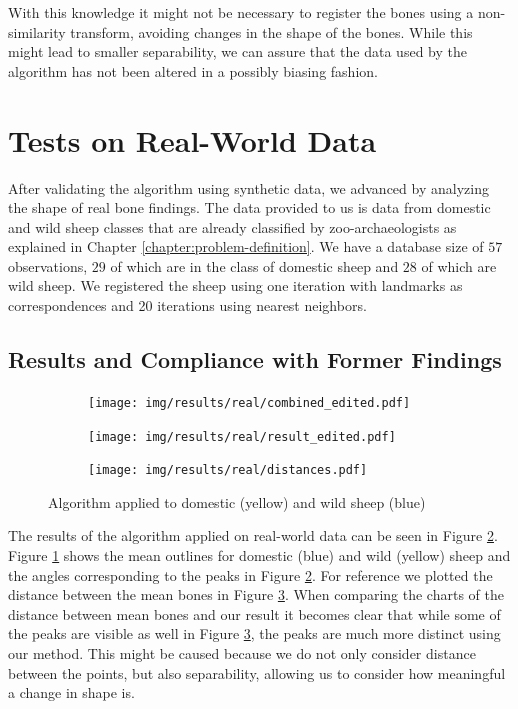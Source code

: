 \documentclass[pdftex,12pt,a4paper]{report}
\begin{document}
With this knowledge it might not be necessary to register the bones using a non-similarity transform, avoiding changes in the shape of the bones. While this might lead to smaller separability, we can assure that the data used by the algorithm has not been altered in a possibly biasing fashion.

\section{Tests on Real-World Data}

After validating the algorithm using synthetic data, we advanced by analyzing the shape of real bone findings. The data provided to us is data from domestic and wild sheep classes that are already classified by zoo-archaeologists as explained in Chapter \ref{chapter:problem-definition}. We have a database size of $57$ observations, $29$ of which are in the class of domestic sheep and $28$ of which are wild sheep. We registered the sheep using one iteration with landmarks as correspondences and 20 iterations using nearest neighbors.

\subsection{Results and Compliance with Former Findings} 

\begin{figure}
	\centering
	\begin{subfigure}[b]{0.32\textwidth}
		\centering
		\texttt{[image: img/results/real/combined\_edited.pdf]}
		\label{fig:main-result-data}
	\end{subfigure}
	\begin{subfigure}[b]{0.32\textwidth}
		\centering
		\texttt{[image: img/results/real/result\_edited.pdf]}
		\label{fig:main-result-chart}
	\end{subfigure}
	\begin{subfigure}[b]{0.32\textwidth}
		\centering
		\texttt{[image: img/results/real/distances.pdf]}
		\label{fig:main-result-distance}
	\end{subfigure}
	\caption{Algorithm applied to domestic (yellow) and wild sheep (blue)}
	\label{fig:main-result}
\end{figure}

The results of the algorithm applied on real-world data can be seen in Figure \ref{fig:main-result-chart}. Figure \ref{fig:main-result-data} shows the mean outlines for domestic (blue) and wild (yellow) sheep and the angles corresponding to the peaks in Figure \ref{fig:main-result-chart}. For reference we plotted the distance between the mean bones in Figure \ref{fig:main-result-distance}. When comparing the charts of the distance between mean bones and our result it becomes clear that while some of the peaks are visible as well in Figure \ref{fig:main-result-distance}, the peaks are much more distinct using our method. This might be caused because we do not only consider distance between the points, but also separability, allowing us to consider how meaningful a change in shape is.
\end{document}

